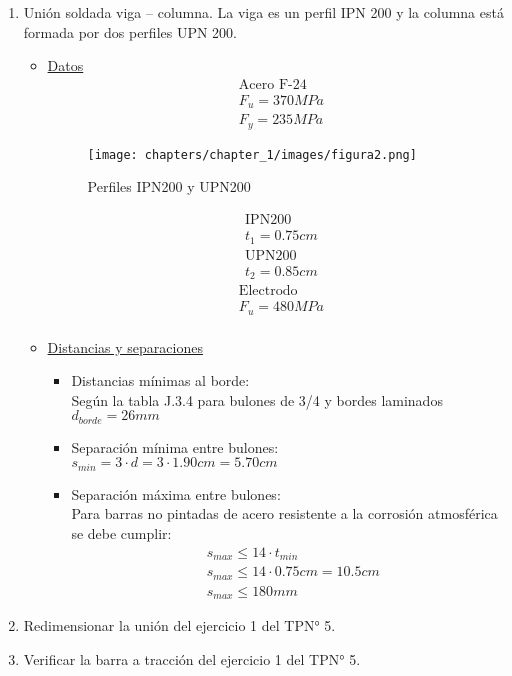 \begin{enumerate}
\item Unión soldada viga – columna. La viga es un perfil IPN 200 y la columna está
formada por dos perfiles UPN 200.
\begin{itemize}
\item \underline{Datos}
\begin{align*}
& \text{Acero F-24}\\
& F_u = 370MPa\\
& F_y = 235MPa
\end{align*}

\begin{figure}[H]
\begin{center}
     \texttt{[image: chapters/chapter\_1/images/figura2.png]}
\end{center}
\caption{Perfiles IPN200 y UPN200}
\end{figure}

\begin{align*}
& \text{IPN200}\\
& t_1 = 0.75 cm
\end{align*}
\begin{align*}
& \text{UPN200}\\
& t_2 = 0.85 cm
\end{align*}
\begin{align*}
& \text{Electrodo}\\
& F_u = 480MPa\\
\end{align*}


\item \underline{Distancias y separaciones}
	\begin{itemize}
	\item Distancias mínimas al borde:\\
	Según la tabla J.3.4 para bulones de 3/4 y bordes laminados $d_{borde} = 26 mm$
	\item Separación mínima entre bulones:\\
	$s_{min} = 3 \cdot d = 3 \cdot 1.90cm = 5.70cm$
	\item Separación máxima entre bulones:\\
	Para barras no pintadas de acero resistente a la corrosión atmosférica se debe cumplir:
	\begin{align*}
	& s_{max} \leq 14 \cdot t_{min}\\
	& s_{max} \leq 14 \cdot 0.75cm = 10.5cm\\
	& s_{max} \leq 180mm
	\end{align*}
	\end{itemize}

\end{itemize}
\item Redimensionar la unión del ejercicio 1 del TPN° 5.



\item Verificar la barra a tracción del ejercicio 1 del TPN° 5.


\end{enumerate}